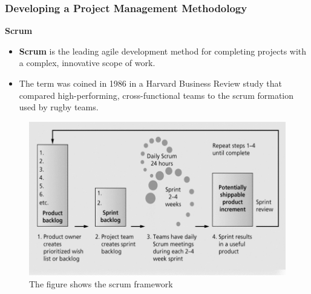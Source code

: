 \documentclass{beamer}
\begin{document}
\begin{frame}
\frametitle{Developing a Project Management Methodology}
\textbf{Scrum}
\vspace{0.25cm}
\begin{itemize}
\item \textbf{Scrum} is the leading agile development method for completing projects with a complex, innovative scope of work.
\item The term was coined in 1986 in a Harvard Business Review study that compared high-performing, cross-functional teams to the scrum formation used by rugby teams.
\end{itemize}
\begin{figure}
\includegraphics[scale=0.27]{scrum}
\caption{The figure shows the scrum framework}
\end{figure}
\end{frame}
\end{document}
